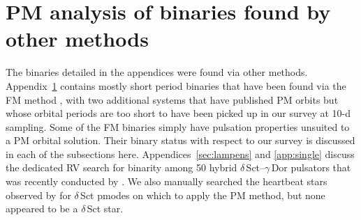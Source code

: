\documentclass[a4paper,fleqn,usenatbib]{mnras}
\begin{document}










\appendix




\section{PM analysis of binaries found by other methods}
\label{sec:shortP}


The binaries detailed in the appendices were found via other methods. Appendix~\ref{sec:shortP} contains mostly short period binaries that have been found via the FM method \citep{shibahashi&kurtz2012,shibahashietal2015}, with two additional systems that have published PM orbits but whose orbital periods are too short to have been picked up in our survey at 10-d sampling. Some of the FM binaries simply have pulsation properties unsuited to a PM orbital solution. Their binary status with respect to our survey is discussed in each of the subsections here. Appendices~\ref{sec:lampens} and \ref{app:single} discuss the dedicated RV search for binarity among 50 hybrid $\delta$\,Sct--$\gamma$\,Dor pulsators that was recently conducted by \citet{lampensetal2017}. We also manually searched the heartbeat stars observed by \citet{shporeretal2016} for $\delta$\,Sct p\:modes on which to apply the PM method, but none appeared to be a $\delta$\,Sct star.
\end{document}
